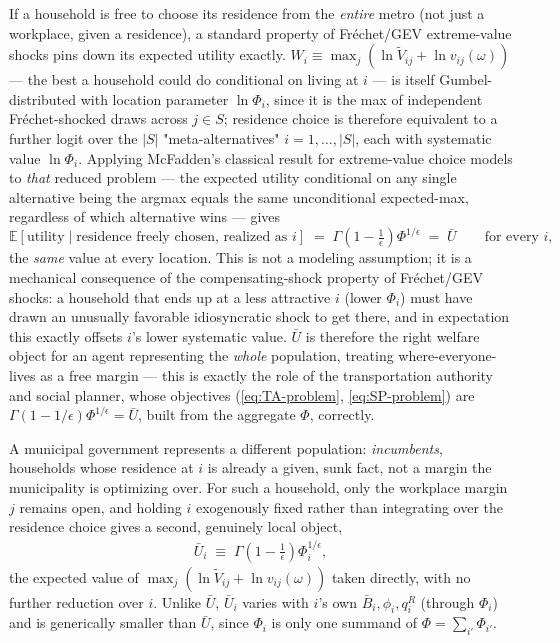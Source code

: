 \documentclass[12pt, a4paper]{article}
\theoremstyle{definition}
\theoremstyle{remark}
\begin{document}
If a household is free to choose its residence from the \emph{entire} metro (not just a workplace, given a residence), a standard property of Fréchet/GEV extreme-value shocks pins down its expected utility exactly. $W_i\equiv\max_j(\ln \tilde V_{ij}+\ln v_{ij}(\omega))$ — the best a household could do conditional on living at $i$ — is itself Gumbel-distributed with location parameter $\ln\Phi_i$, since it is the max of independent Fréchet-shocked draws across $j\in S$; residence choice is therefore equivalent to a further logit over the $|S|$ "meta-alternatives" $i=1,\dots,|S|$, each with systematic value $\ln\Phi_i$. Applying McFadden's classical result for extreme-value choice models to \emph{that} reduced problem — the expected utility conditional on any single alternative being the argmax equals the same unconditional expected-max, regardless of which alternative wins — gives
\[
\mathbb E[\text{utility}\mid \text{residence freely chosen, realized as }i] \;=\; \Gamma\!\left(1-\tfrac1\epsilon\right)\Phi^{1/\epsilon} \;=\; \bar U \qquad\text{for every }i,
\]
the \emph{same} value at every location. This is not a modeling assumption; it is a mechanical consequence of the compensating-shock property of Fréchet/GEV shocks: a household that ends up at a less attractive $i$ (lower $\Phi_i$) must have drawn an unusually favorable idiosyncratic shock to get there, and in expectation this exactly offsets $i$'s lower systematic value. $\bar U$ is therefore the right welfare object for an agent representing the \emph{whole} population, treating where-everyone-lives as a free margin — this is exactly the role of the transportation authority and social planner, whose objectives (\eqref{eq:TA-problem}, \eqref{eq:SP-problem}) are $\Gamma(1-1/\epsilon)\Phi^{1/\epsilon}=\bar U$, built from the aggregate $\Phi$, correctly.

A municipal government represents a different population: \emph{incumbents}, households whose residence at $i$ is already a given, sunk fact, not a margin the municipality is optimizing over. For such a household, only the workplace margin $j$ remains open, and holding $i$ exogenously fixed rather than integrating over the residence choice gives a second, genuinely local object,
\begin{align}
    \label{eq:Ubar-i}
    \bar U_i \;\equiv\; \Gamma\!\left(1-\tfrac1\epsilon\right)\Phi_i^{1/\epsilon},
\end{align}
the expected value of $\max_j(\ln\tilde V_{ij}+\ln v_{ij}(\omega))$ taken directly, with no further reduction over $i$. Unlike $\bar U$, $\bar U_i$ varies with $i$'s own $\bar B_i,\phi_i,q_i^R$ (through $\Phi_i$) and is generically smaller than $\bar U$, since $\Phi_i$ is only one summand of $\Phi=\sum_{i'}\Phi_{i'}$.
\end{document}
